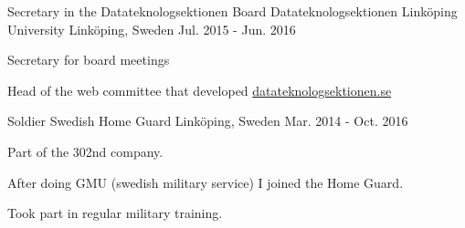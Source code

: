 

\begin{cventries}

  \cventry
    {Secretary in the Datateknologsektionen Board} %
    {Datateknologsektionen Linköping University} %
    {Linköping, Sweden} %
    {Jul. 2015 - Jun. 2016} %
    {
      \begin{cvitems} %
        \item {Secretary for board meetings}
        \item {Head of the web committee that developed \href{https://d-sektionen.se/}{datateknologsektionen.se}}
      \end{cvitems}
    }

\cventry
{Soldier} %
{Swedish Home Guard} %
{Linköping, Sweden} %
{Mar. 2014 - Oct. 2016} %
{
  \begin{cvitems} %
    \item {Part of the 302nd company.}
    \item {After doing GMU (swedish military service) I joined the Home Guard.}
    \item {Took part in regular military training.}
  \end{cvitems}
}


\end{cventries}
